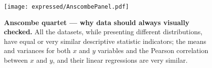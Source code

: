 
\begin{figure}[!ht]
    \texttt{[image: expressed/AnscombePanel.pdf]}\centering
    \caption[Anscombe quartet --- why data should always be visualy checked]
    {\label{fig:Anscombe}\textbf{Anscombe quartet --- why data should always
    visually checked.}\smallbreak{} All the datasets, while presenting
    different distributions, have equal or very similar descriptive statistic
    indicators;
    the means and variances for both $x$ and $y$ variables and
    the Pearson correlation between $x$ and $y$, and
    their linear regressions are very similar.}
\end{figure}

